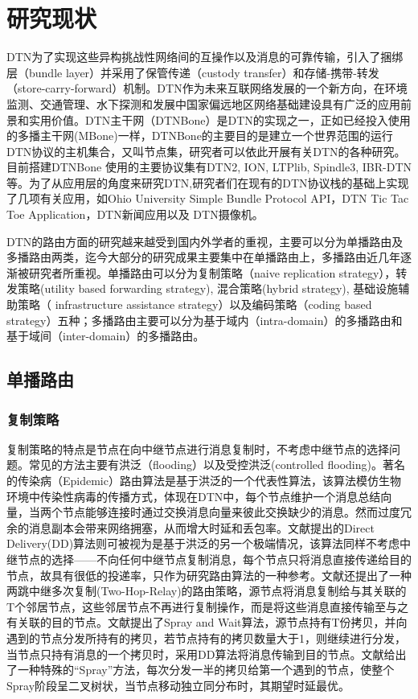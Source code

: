 \chapter{研究现状}

DTN为了实现这些异构挑战性网络间的互操作以及消息的可靠传输，引入了捆绑层（bundle layer）并采用了保管传递（custody transfer）和存储-携带-转发（store-carry-forward）机制。DTN作为未来互联网络发展的一个新方向，在环境监测、交通管理、水下探测和发展中国家偏远地区网络基础建设具有广泛的应用前景和实用价值。DTN主干网（DTNBone）是DTN的实现之一，正如已经投入使用的多播主干网(MBone)一样，DTNBone的主要目的是建立一个世界范围的运行DTN协议的主机集合，又叫节点集，研究者可以依此开展有关DTN的各种研究。目前搭建DTNBone 使用的主要协议集有DTN2, ION, LTPlib, Spindle3, IBR-DTN等。为了从应用层的角度来研究DTN,研究者们在现有的DTN协议栈的基础上实现了几项有关应用，如Ohio University Simple Bundle Protocol API，DTN Tic Tac Toe Application，DTN新闻应用以及 DTN摄像机。

DTN的路由方面的研究越来越受到国内外学者的重视，主要可以分为单播路由及多播路由两类，迄今大部分的研究成果主要集中在单播路由上，多播路由近几年逐渐被研究者所重视。单播路由可以分为复制策略（naive replication strategy），转发策略(utility based forwarding strategy), 混合策略(hybrid strategy), 基础设施辅助策略（ infrastructure assistance strategy）以及编码策略（coding based strategy）五种；多播路由主要可以分为基于域内（intra-domain）的多播路由和基于域间（inter-domain）的多播路由。

\section{单播路由}
\subsection{复制策略}
复制策略的特点是节点在向中继节点进行消息复制时，不考虑中继节点的选择问题。常见的方法主要有洪泛（flooding）以及受控洪泛(controlled flooding)。著名的传染病（Epidemic）路由算法是基于洪泛的一个代表性算法，该算法模仿生物环境中传染性病毒的传播方式，体现在DTN中，每个节点维护一个消息总结向量，当两个节点能够连接时通过交换消息向量来彼此交换缺少的消息。然而过度冗余的消息副本会带来网络拥塞，从而增大时延和丢包率。文献提出的Direct Delivery(DD)算法则可被视为是基于洪泛的另一个极端情况，该算法同样不考虑中继节点的选择——不向任何中继节点复制消息，每个节点只将消息直接传递给目的节点，故具有很低的投递率，只作为研究路由算法的一种参考。文献还提出了一种两跳中继多次复制(Two-Hop-Relay)的路由策略，源节点将消息复制给与其关联的T个邻居节点，这些邻居节点不再进行复制操作，而是将这些消息直接传输至与之有关联的目的节点。文献提出了Spray and Wait算法，源节点持有T份拷贝，并向遇到的节点分发所持有的拷贝，若节点持有的拷贝数量大于1，则继续进行分发，当节点只持有消息的一个拷贝时，采用DD算法将消息传输到目的节点。文献给出了一种特殊的“Spray”方法，每次分发一半的拷贝给第一个遇到的节点，使整个Spray阶段呈二叉树状，当节点移动独立同分布时，其期望时延最优。


